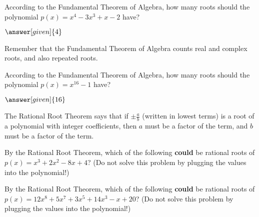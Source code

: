 \documentclass[nooutcomes]{ximera}
\begin{document}
\begin{problem}
According to the Fundamental Theorem of Algebra, how many roots should the polynomial $p(x) = x^4 - 3x^3 + x - 2$ have?
\begin{prompt}
	$\answer[given]{4}$
\end{prompt}
\begin{hint}
	Remember that the Fundamental Theorem of Algebra counts real and complex roots, and also repeated roots.
\end{hint}
\end{problem}



\begin{problem}
According to the Fundamental Theorem of Algebra, how many roots should the polynomial $p(x) = x^{16} - 1$ have?
\begin{prompt}
	$\answer[given]{16}$
\end{prompt}
\end{problem}

\begin{problem}
The Rational Root Theorem says that if $\pm \frac{a}{b}$ (written in lowest terms) is a root of a polynomial with 
integer coefficients, then $a$ must be a factor of the 
 term, and $b$ must be a factor of the 
term.
\end{problem}

\begin{problem}
By the Rational Root Theorem, which of the following \textbf{could} be rational roots of $p(x) = x^3 + 2x^2 - 8x + 4$?   
(Do not solve this problem by plugging the values into the polynomial!)
\begin{selectAll}
\end{selectAll}
\end{problem}




\begin{problem}
By the Rational Root Theorem, which of the following \textbf{could} be rational roots of $p(x) = 12x^8 + 5x^7 + 3x^5 + 14x^3 - x + 20$?
(Do not solve this problem by plugging the values into the polynomial!)
\begin{selectAll}
\end{selectAll}
\end{problem}
\end{document}
